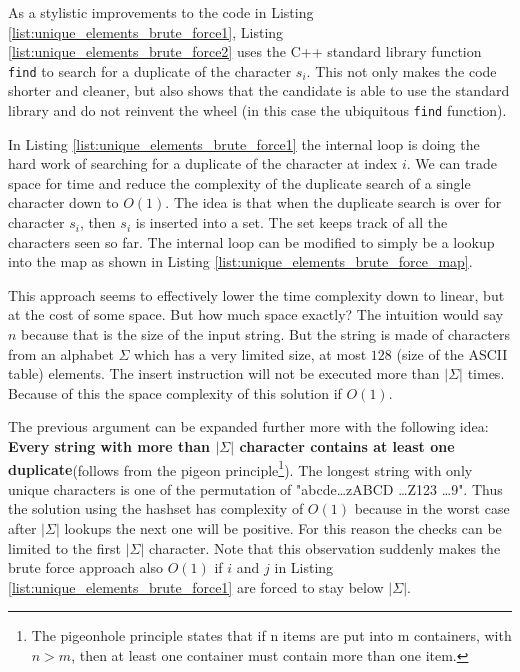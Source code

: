 As a stylistic improvements to the code in Listing \ref{list:unique_elements_brute_force1}, Listing \ref{list:unique_elements_brute_force2}  uses the C++ standard library function \texttt{find} to search for a duplicate  of the character $s_i$. This not only makes the code shorter and cleaner, but also shows that the candidate is able to use the standard library and do not reinvent the wheel (in this case the ubiquitous \texttt{find} function).

\begin{minipage}{\linewidth}
	
\end{minipage}

In Listing \ref{list:unique_elements_brute_force1} the internal loop is doing the hard work of searching for a duplicate of the character at index $i$. We can trade space for time and reduce the complexity of the duplicate search of a single character down to $O(1)$. The idea is that when the duplicate search is over for character $s_i$, then $s_i$ is inserted into a set. The set keeps track of all the characters seen so far. The internal loop can be modified to simply be a lookup into the map as shown in Listing \ref{list:unique_elements_brute_force_map}.

\begin{minipage}{\linewidth}
	
\end{minipage}

This approach seems to effectively lower the time complexity down to linear, but at the cost of some space. But how much space exactly? The intuition would say $n$ because that is the size of the  input string. But the string is made of characters from an alphabet $\Sigma$ which has a very limited size, at most $128$ (size of the ASCII table) elements. The insert instruction will not be executed more than $|\Sigma|$ times. Because of this the space complexity of this solution if $O(1)$. 

The previous argument can be expanded further more with the following idea: \textbf{Every string with more than $|\Sigma|$ character contains at least one duplicate}(follows from the pigeon principle\footnote{The pigeonhole principle states that if n items are put into m containers, with $n > m$, then at least one container must contain more than one item.}). The longest string with only unique characters is one of the permutation of "abcde\ldots zABCD \ldots Z123 \ldots 9".
Thus the solution using the hashset has complexity of $O(1)$ because in the worst case after $|\Sigma|$ lookups the next one will be positive. For this reason the checks can be limited to the first $|\Sigma|$ character. Note that this observation suddenly makes the brute force approach also $O(1)$ if $i$ and $j$ in Listing \ref{list:unique_elements_brute_force1} are forced to stay below $|\Sigma|$.


